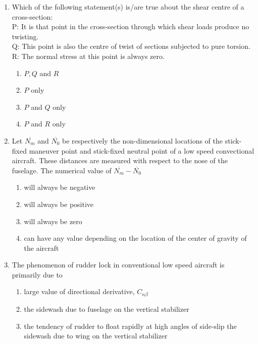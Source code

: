 \documentclass[journal,12pt,onecolumn]{IEEEtran}
\theoremstyle{remark}
\begin{document}
\begin{enumerate}[start=1]
\item Which of the following statement(s) is/are true about the shear centre of a cross-section:\\
	P: It is that point in the cross-section through which shear loads produce no twisting.\\
	Q: This point is also the centre of twist of sections subjected to pure torsion.\\
	R: The normal stress at this point is always zero.\\
	\begin{enumerate}
		\item $P,Q$ and $R$
		\item $P$ only
		\item $P$ and $Q$ only
		\item $P$ and $R$ only
	\end{enumerate}

\item Let $\overline{N_m}$ and $\overline{N_0}$ be respectively the non-dimensional locations of the stick-fixed maneuver point and stick-fixed neutral point of a low speed convectional aircraft. These distances are measured with respect to the nose of the fuselage. The numerical value of $\overline{N_m}-\overline{N_0}$
	\begin{enumerate}
		\item will always be negative
		\item will always be positive
		\item will always be zero
		\item can have any value depending on the location of the center of gravity of the aircraft
	\end{enumerate}
\item The phenomenon of rudder lock in conventional low speed aircraft is primarily due to 
	\begin{enumerate}
		\item large value of directional derivative, $C_{n\beta}$
		\item the sidewash due to fuselage on the vertical stabilizer
		\item the tendency of rudder to float rapidly at high angles of side-slip the sidewash due to wing on the vertical stabilizer 
	\end{enumerate}
\end{enumerate}
\end{document}
